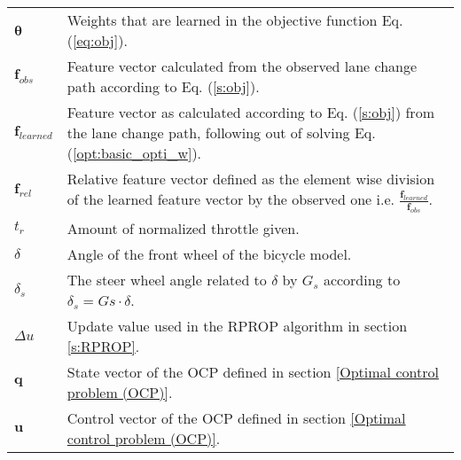 \documentclass[master=wtk,english]{kulemt}
\begin{document}
\begin{flushleft}
	\renewcommand{\arraystretch}{1.1}
	\begin{tabularx}{\textwidth}{@{}p{12mm}X@{}}
		$\bm{\theta}$ & Weights that are learned in the objective function Eq. (\ref{eq:obj}).\\
		$\bm{f}_{obs}$ & Feature vector calculated from the observed lane change path according to Eq. (\ref{s:obj}).\\
		$\bm{f}_{learned}$ & Feature vector as calculated according to Eq. (\ref{s:obj}) from the lane change path, following out of solving Eq. (\ref{opt:basic_opti_w}).\\
		$\bm{f}_{rel}$ & Relative feature vector defined as the element wise division of the learned feature vector by the observed one i.e. $\frac{\bm{f}_{learned}}{\bm{f}_{obs}}$.\\
		$t_r$ & Amount of normalized throttle given.\\
		$\delta$ & Angle of the front wheel of the bicycle model.\\
		$\delta_{s} $ & The steer wheel angle related to $\delta$ by $G_s$ according to $\delta_s = Gs \cdot\delta$.  \\
		$\Delta u$ & Update value used in the RPROP algorithm in section \ref{s:RPROP}.\\
		$\bm{q}$ & State vector of the OCP defined in section \ref{Optimal control problem (OCP)}.\\
		$\bm{u}$ & Control vector of the OCP defined in section \ref{Optimal control problem (OCP)}.
		
		
	\end{tabularx}
\end{flushleft}

\mainmatter







%


\appendixpage*          %
\appendix






\backmatter


%
\end{document}
